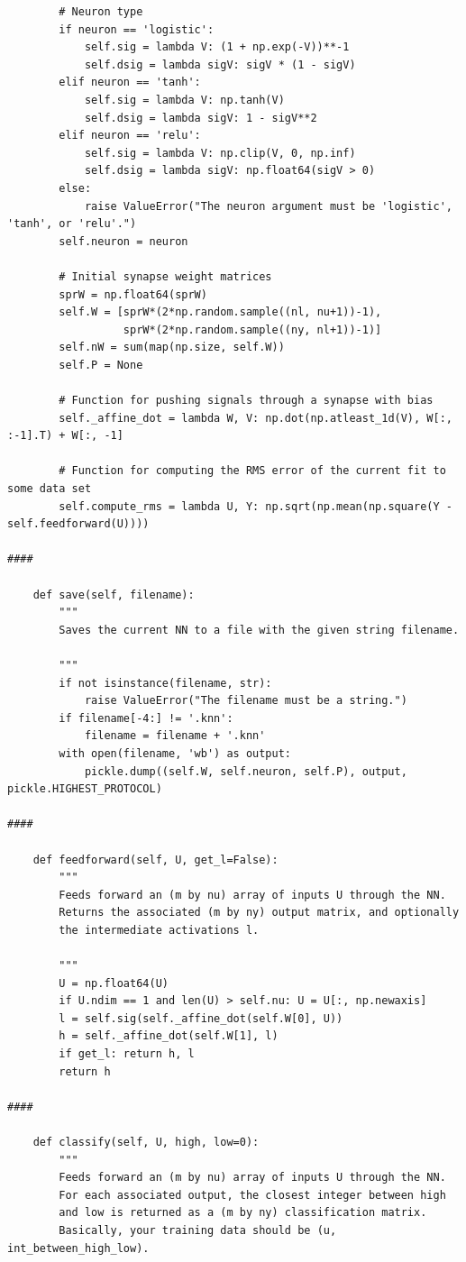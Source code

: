 \documentclass{article}
\begin{document}
\begin{verbatim}
        # Neuron type
        if neuron == 'logistic':
            self.sig = lambda V: (1 + np.exp(-V))**-1
            self.dsig = lambda sigV: sigV * (1 - sigV)
        elif neuron == 'tanh':
            self.sig = lambda V: np.tanh(V)
            self.dsig = lambda sigV: 1 - sigV**2
        elif neuron == 'relu':
            self.sig = lambda V: np.clip(V, 0, np.inf)
            self.dsig = lambda sigV: np.float64(sigV > 0)
        else:
            raise ValueError("The neuron argument must be 'logistic', 'tanh', or 'relu'.")
        self.neuron = neuron

        # Initial synapse weight matrices
        sprW = np.float64(sprW)
        self.W = [sprW*(2*np.random.sample((nl, nu+1))-1),
                  sprW*(2*np.random.sample((ny, nl+1))-1)]
        self.nW = sum(map(np.size, self.W))
        self.P = None

        # Function for pushing signals through a synapse with bias
        self._affine_dot = lambda W, V: np.dot(np.atleast_1d(V), W[:, :-1].T) + W[:, -1]

        # Function for computing the RMS error of the current fit to some data set
        self.compute_rms = lambda U, Y: np.sqrt(np.mean(np.square(Y - self.feedforward(U))))

####

    def save(self, filename):
        """
        Saves the current NN to a file with the given string filename.

        """
        if not isinstance(filename, str):
            raise ValueError("The filename must be a string.")
        if filename[-4:] != '.knn':
            filename = filename + '.knn'
        with open(filename, 'wb') as output:
            pickle.dump((self.W, self.neuron, self.P), output, pickle.HIGHEST_PROTOCOL)

####

    def feedforward(self, U, get_l=False):
        """
        Feeds forward an (m by nu) array of inputs U through the NN.
        Returns the associated (m by ny) output matrix, and optionally
        the intermediate activations l.

        """
        U = np.float64(U)
        if U.ndim == 1 and len(U) > self.nu: U = U[:, np.newaxis]
        l = self.sig(self._affine_dot(self.W[0], U))
        h = self._affine_dot(self.W[1], l)
        if get_l: return h, l
        return h

####

    def classify(self, U, high, low=0):
        """
        Feeds forward an (m by nu) array of inputs U through the NN.
        For each associated output, the closest integer between high
        and low is returned as a (m by ny) classification matrix.
        Basically, your training data should be (u, int_between_high_low).


\end{verbatim}
\end{document}
